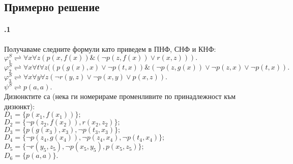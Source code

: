 \documentclass[12pt]{article}
\begin{document}
\subsection{Примерно решение}
\paragraph{\hspace{0.5em} .1}
\begin{addmargin}[1em]{2em}
Получаваме следните формули като приведем в ПНФ, СНФ и КНФ: \\
$\varphi_1^S \rightleftharpoons \forall x \forall z (p(x,f(x))\&(\neg p(z, f(x))\lor r(x,z))). $ \\
$\varphi_2^S \rightleftharpoons \forall x \forall t \forall z((p(g(x),x)\lor \neg p(t,x))\&(\neg p(z, g(x)) \lor \neg p(z,x) \lor \neg p(t,x)). $ \\
$\varphi_3^S \rightleftharpoons \forall x \forall y \forall z (\neg r(y,z) \lor \neg p(x,y) \lor p(x, z)). $ \\
$\psi^S \rightleftharpoons p(a,a).$ \\
Дизюнктите са (нека ги номерираме променливите по принадлежност към дизюнкт): \\
$D_1 = \{ p(x_1,f(x_1))\};$ \\
$D_2 = \{ \neg p(z_2, f(x_2)), r(x_2, z_2)\};$ \\
$D_3 = \{ p(g(x_3), x_3), \neg p(t_3, x_3)\};$ \\
$D_4 = \{ \neg p(z_4,g(x_4)), \neg p(z_4, x_4), \neg p(t_4, x_4)\};$ \\
$D_5 = \{ \neg r(y_5,z_5), \neg p( x_5,y_5), p(x_5, z_5)\};$ \\
$D_6 = \{ p(a,a)\}.$
\end{addmargin}
\end{document}
